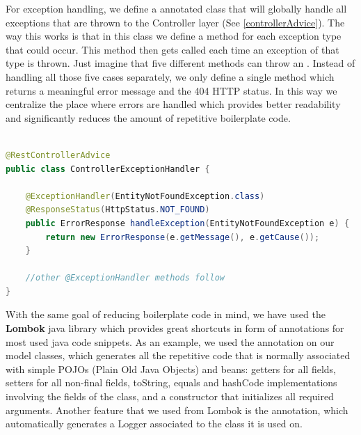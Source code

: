 For exception handling, we define a  annotated class that will globally handle all exceptions that are thrown to the Controller layer (See \ref{controllerAdvice}). The way this works is that in this class we define a method for each exception type that could occur. This method then gets called each time an exception of that type is thrown. Just imagine that five different methods can throw an . Instead of handling all those five cases separately, we only define a single method which returns a meaningful error message and the 404 HTTP status. In this way we centralize the place where errors are handled which provides better readability and significantly reduces the amount of repetitive boilerplate code.

\begin{lstlisting}[language=Java, caption={Simplified example of global exception handling class}, label={controllerAdvice}]

@RestControllerAdvice
public class ControllerExceptionHandler {

    @ExceptionHandler(EntityNotFoundException.class)
    @ResponseStatus(HttpStatus.NOT_FOUND)
    public ErrorResponse handleException(EntityNotFoundException e) {
        return new ErrorResponse(e.getMessage(), e.getCause());
    }

    //other @ExceptionHandler methods follow
}

\end{lstlisting}

With the same goal of reducing boilerplate code in mind, we have used the \textbf{Lombok} java library which provides great shortcuts in form of annotations for most used java code snippets. As an example, we used the  annotation on our model classes, which generates all the repetitive code that is normally associated with simple POJOs (Plain Old Java Objects) and beans: getters for all fields, setters for all non-final fields, toString, equals and hashCode implementations involving the fields of the class, and a constructor that initializes all required arguments. Another feature that we used from Lombok is the  annotation, which automatically generates a Logger associated to the class it is used on.

